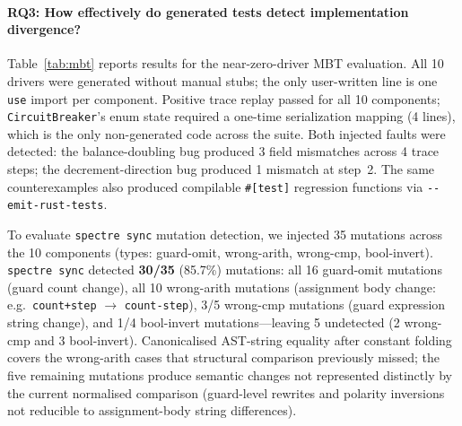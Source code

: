 \documentclass[runningheads]{llncs}
\begin{document}
\paragraph{RQ3: How effectively do generated tests detect implementation divergence?}

Table~\ref{tab:mbt} reports results for the near-zero-driver MBT evaluation.
All 10 drivers were generated without manual stubs; the only user-written line
is one \texttt{use} import per component.  Positive trace replay passed for
all 10 components; \texttt{CircuitBreaker}'s enum state required a
one-time serialization mapping (4 lines), which is the only non-generated code
across the suite.
Both injected faults were detected: the balance-doubling bug produced 3 field
mismatches across 4 trace steps; the decrement-direction bug produced 1
mismatch at step~2.  The same counterexamples also produced compilable
\texttt{\#[test]} regression functions via \texttt{-{}-emit-rust-tests}.

To evaluate \texttt{spectre sync} mutation detection, we injected 35 mutations
across the 10 components (types: guard-omit, wrong-arith, wrong-cmp,
bool-invert).
\texttt{spectre sync} detected \textbf{30/35} (85.7\%) mutations: all 16
guard-omit mutations (guard count change), all 10 wrong-arith mutations
(assignment body change: e.g.\ \texttt{count+step} $\to$ \texttt{count-step}),
3/5 wrong-cmp mutations (guard expression string change), and 1/4
bool-invert mutations---leaving 5 undetected (2 wrong-cmp and 3 bool-invert).
Canonicalised AST-string equality after constant folding covers the wrong-arith
cases that structural comparison previously missed; the five remaining mutations
produce semantic changes not represented distinctly by the current normalised
comparison (guard-level rewrites and polarity inversions not reducible to
assignment-body string differences).
\end{document}
